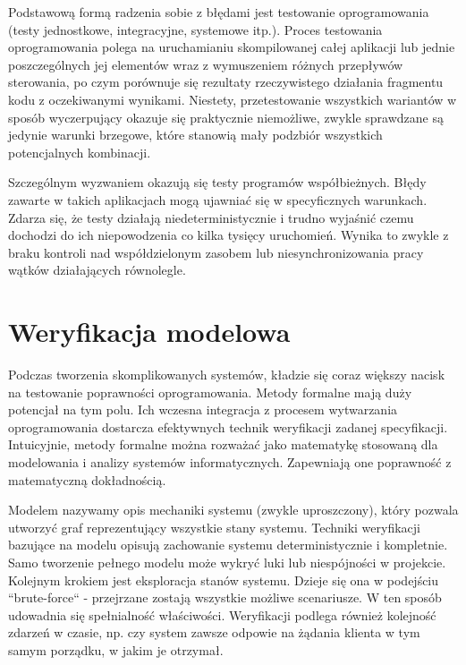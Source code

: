 Podstawową formą radzenia sobie z błędami jest testowanie oprogramowania (testy jednostkowe, integracyjne, systemowe itp.).
Proces testowania oprogramowania polega na uruchamianiu skompilowanej całej aplikacji lub jednie poszczególnych jej elementów wraz z wymuszeniem różnych przepływów sterowania, po czym porównuje się rezultaty rzeczywistego działania fragmentu kodu z oczekiwanymi wynikami.
Niestety, przetestowanie wszystkich wariantów w sposób wyczerpujący okazuje się praktycznie niemożliwe, zwykle sprawdzane są jedynie warunki brzegowe, które stanowią mały podzbiór wszystkich potencjalnych kombinacji.

Szczególnym wyzwaniem okazują się testy programów współbieżnych.
Błędy zawarte w takich aplikacjach mogą ujawniać się w specyficznych warunkach.
Zdarza się, że testy działają niedeterministycznie i trudno wyjaśnić czemu dochodzi do ich niepowodzenia co kilka tysięcy uruchomień.
Wynika to zwykle z braku kontroli nad współdzielonym zasobem lub niesynchronizowania pracy wątków działających równolegle.


\section{Weryfikacja modelowa}

Podczas tworzenia skomplikowanych systemów, kładzie się coraz większy nacisk na testowanie poprawności oprogramowania.
Metody formalne mają duży potencjał na tym polu.
Ich wczesna integracja z procesem wytwarzania oprogramowania dostarcza efektywnych technik weryfikacji zadanej specyfikacji.
Intuicyjnie, metody formalne można rozważać jako matematykę stosowaną dla modelowania i analizy systemów informatycznych.
Zapewniają one poprawność z matematyczną dokładnością.

Modelem nazywamy opis mechaniki systemu (zwykle uproszczony), który pozwala utworzyć graf reprezentujący wszystkie stany systemu.
Techniki weryfikacji bazujące na modelu opisują zachowanie systemu deterministycznie i kompletnie.
Samo tworzenie pełnego modelu może wykryć luki lub niespójności w projekcie.
Kolejnym krokiem jest eksploracja stanów systemu.
Dzieje się ona w podejściu ``brute-force`` - przejrzane zostają wszystkie możliwe scenariusze.
W ten sposób udowadnia się spełnialność właściwości.
Weryfikacji podlega również kolejność zdarzeń w czasie, np. czy system zawsze odpowie na żądania klienta w tym samym porządku, w jakim je otrzymał.

